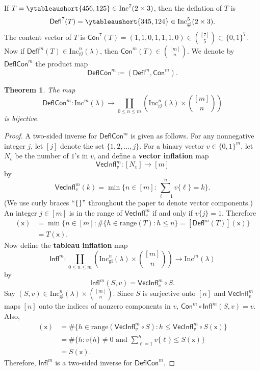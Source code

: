 \documentclass[12pt]{amsart}
\newcommand{\x}{\ensuremath{\mathsf{x}}}
\newtheorem{theorem}{Theorem}[section]
\theoremstyle{definition}
\newenvironment{example}
  {\pushQED{\qed}\renewcommand{\qedsymbol}{$\diamondsuit$}\examplex}
  {\popQED\endexamplex}
\theoremstyle{remark}
\numberwithin{equation}{section}
\newcommand{\inc}{\ensuremath{\mathrm{Inc}}}
\newcommand{\incgl}{\inc_{\mathrm{gl}}}
\newcommand{\deflate}{\ensuremath{\mathsf{Defl}}}
\newcommand{\inflate}{\ensuremath{\mathsf{VecInfl}}}
\newcommand{\tinflate}{\ensuremath{\mathsf{Infl}}}
\newcommand{\content}{\ensuremath{\mathsf{Con}}}
\newcommand{\compress}{\ensuremath{\mathsf{DeflCon}}}
\begin{document}
\begin{example}\label{ex:deflate}
If $T = \ytableaushort{456,125} \in \inc^7(2 \times 3)$, then the deflation of $T$ is \[\deflate^7(T) = \ytableaushort{345,124} \in \incgl^5(2 \times 3).\] The content vector of $T$ is $\content^7(T) = (1,1,0,1,1,1,0) \in \binom{[7]}{5} \subset \{0,1\}^7$.
\end{example}
Now if $\deflate^m(T) \in \incgl^n(\lambda)$, then $\content^m(T) \in \binom{[m]}{n}$. We denote by $\compress^m$ the product map
\[
\compress^m \coloneqq (\deflate^m,\content^m).
\] 
\begin{theorem}\label{thm:compressbijective} The map 
\[
\compress^m : \inc^m(\lambda) \to \coprod_{0 \leq n \leq m} \left( \incgl^n(\lambda) \times \binom{[m]}{n} \right)
\]
 is bijective.
\end{theorem}
\begin{proof}
A two-sided inverse for $\compress^m$ is given as follows. For any nonnegative integer $j$, let $[j]$ denote the set $\{1, 2, \dots, j\}$.
For a binary vector $v \in \{0,1\}^m$, let $N_v$ be the number of $1$'s in $v$, and define a {\bf vector inflation} map \[\inflate^m_v : [N_v] \to [m]\] by
\[ \inflate^m_v(k) = \min \bigg\lbrace n \in [m]:   \sum_{\ell = 1}^n v\lbrace \ell \rbrace = k \bigg\rbrace.\] (We use curly braces $``\{\}"$ throughout the paper to denote vector components.) An integer $j \in [m]$ is in the range of $\inflate^m_v$ if and only if $v\lbrace j \rbrace = 1$. Therefore
\begin{align*}
[\inflate^m_{\content^m(T)} \circ \deflate^m(T)](\x) &= \min \bigg\lbrace n \in [m]:    \# \{ h \in \mathrm{range}(T): h \leq n \} = [\deflate^m(T)](\x) \bigg\rbrace \\ &= T(\x). 
\end{align*} Now define the {\bf tableau inflation} map 
\[
\tinflate^m : \coprod_{0 \leq n \leq m} \left( \incgl^n(\lambda) \times \binom{[m]}{n} \right) \to \inc^m(\lambda)
\] 
by 
\[
\tinflate^m(S,v) = \inflate^m_v \circ S.
\]
Say $(S,v) \in \incgl^n(\lambda) \times \binom{[m]}{n}$. Since $S$ is surjective onto $[n]$ and $\inflate^m_v$ maps $[n]$ onto the indices of nonzero components in $v$, $\content^m \circ \tinflate^m(S,v) = v$.  Also,
\begin{align*}
 [\deflate^m(\inflate^m_v  \circ S)](\x) &= \# \{ h \in \mathrm{range}(\inflate^m_v \circ S): h \leq \inflate^m_v \circ S(\x) \} \\  
 &= \# \{ h: v\{h\} \neq 0 \text{ and } \sum_{\ell = 1}^h v\{\ell\} \leq S(\x)  \} \\
 &= S(\x).
\end{align*}
Therefore, $\tinflate^m$ is a two-sided inverse for $\compress^m$.
\end{proof} 
\end{document}
